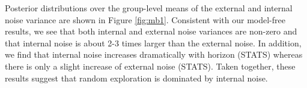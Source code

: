 \documentclass[12pt]{article}
\begin{document}
	Posterior distributions over the group-level means of the external and internal noise variance are shown in Figure \ref{fig:mb1}. Consistent with our model-free results, we see that both internal and external noise variances are non-zero and that internal noise is about 2-3 times larger than the external noise. In addition, we find that internal noise increases dramatically with horizon (STATS) whereas there is only a slight increase of external noise (STATS).  Taken together, these results suggest that random exploration is dominated by internal noise.
	
	
	
	
	
	
\end{document}

